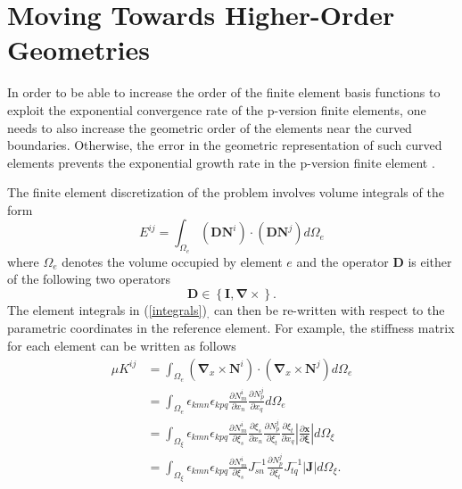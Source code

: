 \documentclass[review,12pt]{elsarticle_summary_report}
\newcommand{\bs}[1]{\boldsymbol{#1}}
\newcommand{\pr}[1]{\left( #1 \right)}
\newcommand{\cbr}[1]{\left\lbrace #1 \right\rbrace}
\newcommand{\abs}[1]{\left | #1 \right |}
\newcommand{\mref}[2]{(#1)$_{\text{#2}}$}
\begin{document}
\section{\label{high_order_geom}Moving Towards Higher-Order Geometries}

In order to be able to increase the order of the finite element basis functions to exploit the exponential convergence rate of the p-version finite elements, one needs to also increase the geometric order of the elements near the curved boundaries. Otherwise, the error in the geometric representation of such curved elements prevents the exponential growth rate in the p-version finite element \cite{LuoShephard_04, DeyShephard_97, LuoShephard_02}.

The finite element discretization of the problem involves volume integrals of the form \cite{LeeLi_09}
\begin{equation}
  E^{ij} =  \int _{\Omega _e} \pr{\bs{D} \textbf{N}^i} \cdot \pr{\bs{D} \textbf{N}^j} d\Omega _e	
  \label{integrals}
\end{equation}
where $\Omega _e$ denotes the volume occupied by element $e$ and the operator $\bs{D}$ is either of the following two operators 
\begin{equation}
  \bs{D} \in \cbr{\bs{I}, \bs{\nabla} \times }.
\end{equation}
The element integrals in \mref{\ref{integrals}}, can then be re-written with respect to the parametric coordinates in the reference element. For example, the stiffness matrix for each element can be written as follows
\begin{equation}
\begin{aligned}
  \mu  K^{ij}	&= \int _{\Omega _e} \pr{\bs{\nabla} _x \times \textbf{N}^i} \cdot \pr{\bs{\nabla} _x \times \textbf{N}^j} d\Omega _e \\
  &= \int _{\Omega _e} \epsilon _{kmn} \epsilon_{kpq} \frac{\partial N^i_m}{\partial x_n} \frac{\partial N^j_p}{\partial x_q}   d\Omega _e \\
  &= \int _{\Omega _ {{\xi}}} \epsilon _{kmn} \epsilon_{kpq} \frac{\partial N^i_m}{\partial \xi_s} \frac{\partial \xi_s}{\partial x_n}  \frac{\partial N^j_p}{\partial \xi_t}  \frac{\partial \xi_t}{\partial x_q} \abs{\frac{\partial \mathbf{x}}{\partial \bs{\xi}}  } d\Omega _ {{\xi}} \\
  &= \int _{\Omega _{{\xi}}} \epsilon _{kmn} \epsilon_{kpq} \frac{\partial N^i_m}{\partial \xi_s} J^{-1}_{sn}  \frac{\partial N^j_p}{\partial \xi_t}  J^{-1}_{tq} \abs{\bs{J}} d\Omega _ {{\xi}}.
\end{aligned}
\end{equation}
\end{document}
